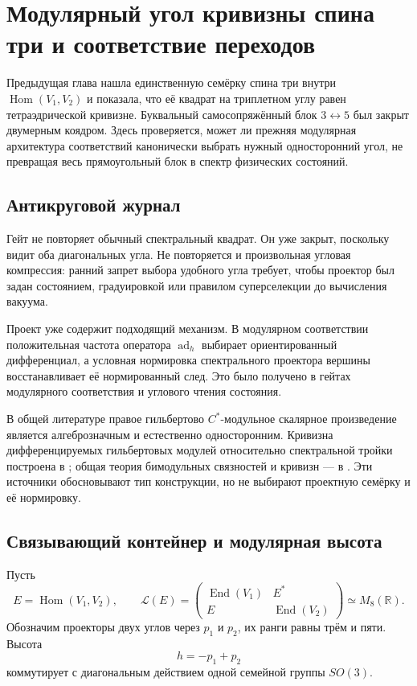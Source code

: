\chapter{Модулярный угол кривизны спина три и соответствие переходов}

Предыдущая глава нашла единственную семёрку спина три внутри
$\operatorname{Hom}(V_1,V_2)$ и показала, что её квадрат на триплетном
углу равен тетраэдрической кривизне. Буквальный самосопряжённый блок
$3\leftrightarrow5$ был закрыт двумерным коядром. Здесь проверяется,
может ли прежняя модулярная архитектура соответствий канонически выбрать
нужный односторонний угол, не превращая весь прямоугольный блок в спектр
физических состояний.

\section{Антикруговой журнал}

Гейт не повторяет обычный спектральный квадрат. Он уже закрыт, поскольку
видит оба диагональных угла. Не повторяется и произвольная угловая
компрессия: ранний запрет выбора удобного угла требует, чтобы проектор
был задан состоянием, градуировкой или правилом суперселекции до
вычисления вакуума.

Проект уже содержит подходящий механизм. В модулярном соответствии
положительная частота оператора $\operatorname{ad}_h$ выбирает
ориентированный дифференциал, а условная нормировка спектрального
проектора вершины восстанавливает её нормированный след. Это было
получено в гейтах модулярного соответствия и углового чтения состояния.

В общей литературе правое гильбертово $C^*$-модульное скалярное
произведение является алгеброзначным и естественно односторонним.
Кривизна дифференцируемых гильбертовых модулей относительно спектральной
тройки построена в ; общая теория бимодульных
связностей и кривизн --- в . Эти источники
обосновывают тип конструкции, но не выбирают проектную семёрку и её
нормировку.

\section{Связывающий контейнер и модулярная высота}

Пусть
\begin{equation}
 E=\operatorname{Hom}(V_1,V_2),
 \qquad
 \mathcal L(E)=
 \begin{pmatrix}
  \operatorname{End}(V_1)&E^*\\
  E&\operatorname{End}(V_2)
 \end{pmatrix}
 \simeq M_8(\mathbb R).
 \label{eq:v6-spin-three-linking-container}
\end{equation}
Обозначим проекторы двух углов через $p_1$ и $p_2$, их ранги равны трём
и пяти. Высота
\begin{equation}
 h=-p_1+p_2
 \label{eq:v6-spin-three-modular-height}
\end{equation}
коммутирует с диагональным действием одной семейной группы $SO(3)$.

